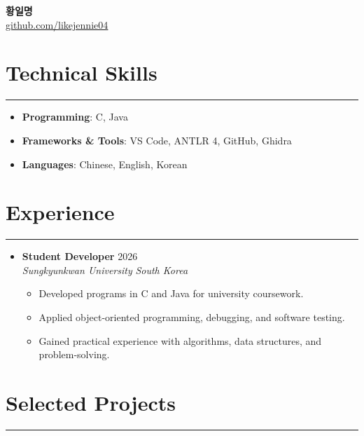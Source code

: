 \documentclass[letterpaper,10pt]{article}
\begin{document}
\begin{center}
    \textbf{\LARGE 황일명} \\ \vspace{2pt}
    \href{https://github.com/likejennie04}
    {\underline{github.com/likejennie04}}
\end{center}


\section*{Technical Skills}
\hrule
\vspace{4pt}

\begin{itemize}
    \item[] \textbf{Programming}: C, Java
    \item[] \textbf{Frameworks \& Tools}: VS Code, ANTLR 4, GitHub, Ghidra
    \item[] \textbf{Languages}: Chinese, English, Korean
\end{itemize}


\section*{Experience}
\hrule
\vspace{4pt}

\begin{itemize}
    \item[]
    \textbf{Student Developer} \hfill 2026 \\
    \textit{Sungkyunkwan University} \hfill \textit{South Korea}

    \begin{itemize}
        \item Developed programs in C and Java for university coursework.
        \item Applied object-oriented programming, debugging, and software testing.
        \item Gained practical experience with algorithms, data structures, and problem-solving.
    \end{itemize}
\end{itemize}


\section*{Selected Projects}
\hrule
\vspace{4pt}
\end{document}
